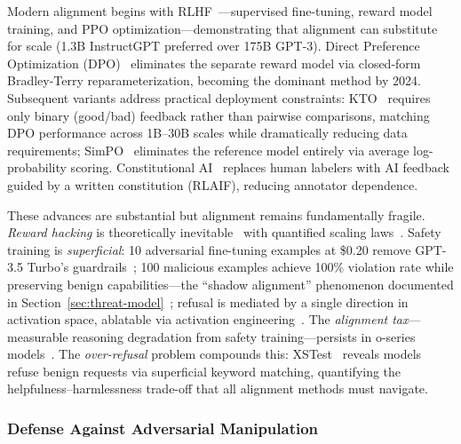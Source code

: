 Modern alignment begins with RLHF~\cite{ouyang2022rlhf}---supervised fine-tuning, reward model training, and PPO optimization---demonstrating that alignment can substitute for scale (1.3B InstructGPT preferred over 175B GPT-3). Direct Preference Optimization (DPO)~\cite{rafailov2023dpo} eliminates the separate reward model via closed-form Bradley-Terry reparameterization, becoming the dominant method by 2024. Subsequent variants address practical deployment constraints: KTO~\cite{ethayarajh2024kto} requires only binary (good/bad) feedback rather than pairwise comparisons, matching DPO performance across 1B--30B scales while dramatically reducing data requirements; SimPO~\cite{meng2024simpo} eliminates the reference model entirely via average log-probability scoring. Constitutional AI~\cite{bai2022constitutionalai} replaces human labelers with AI feedback guided by a written constitution (RLAIF), reducing annotator dependence.

These advances are substantial but alignment remains fundamentally fragile. \emph{Reward hacking} is theoretically inevitable~\cite{skalse2022rewardhacking} with quantified scaling laws~\cite{gao2023scalinglaws}. Safety training is \emph{superficial}: 10 adversarial fine-tuning examples at \$0.20 remove GPT-3.5 Turbo's guardrails~\cite{qi2024finetuning}; 100 malicious examples achieve 100\% violation rate while preserving benign capabilities---the ``shadow alignment'' phenomenon documented in Section~\ref{sec:threat-model}~\cite{yang2023shadow}; refusal is mediated by a single direction in activation space, ablatable via activation engineering~\cite{arditi2024refusal}. The \emph{alignment tax}---measurable reasoning degradation from safety training---persists in o-series models~\cite{huang2025safetytax}. The \emph{over-refusal} problem compounds this: XSTest~\cite{rottger2024xstest} reveals models refuse benign requests via superficial keyword matching, quantifying the helpfulness--harmlessness trade-off that all alignment methods must navigate.


\subsubsection{Defense Against Adversarial Manipulation}
\label{sec:defense}

